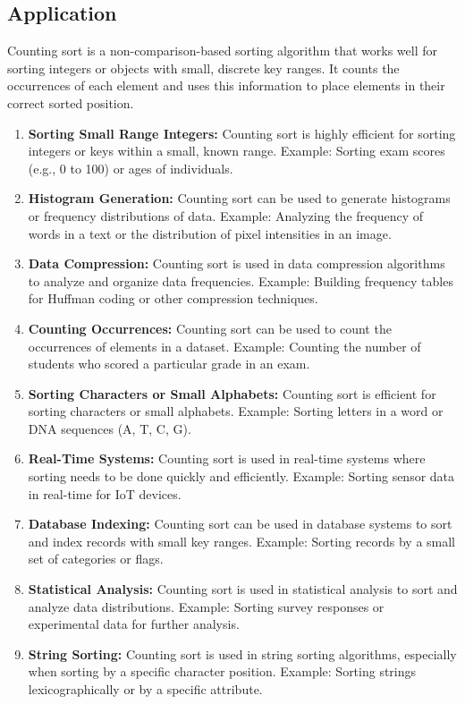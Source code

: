 \subsection{Application}
Counting sort is a non-comparison-based sorting algorithm that works well for sorting integers or objects with small, discrete key ranges. It counts the occurrences of each element and uses this information to place elements in their correct sorted position.
\begin{enumerate}
    \item \textbf{Sorting Small Range Integers:} Counting sort is highly efficient for sorting integers or keys within a small, known range. Example: Sorting exam scores (e.g., 0 to 100) or ages of individuals.
    \item \textbf{Histogram Generation:} Counting sort can be used to generate histograms or frequency distributions of data. Example: Analyzing the frequency of words in a text or the distribution of pixel intensities in an image.
    \item \textbf{Data Compression:} Counting sort is used in data compression algorithms to analyze and organize data frequencies. Example: Building frequency tables for Huffman coding or other compression techniques.
    \item \textbf{Counting Occurrences:} Counting sort can be used to count the occurrences of elements in a dataset. Example: Counting the number of students who scored a particular grade in an exam.
    \item \textbf{Sorting Characters or Small Alphabets:} Counting sort is efficient for sorting characters or small alphabets. Example: Sorting letters in a word or DNA sequences (A, T, C, G).
    \item \textbf{Real-Time Systems:} Counting sort is used in real-time systems where sorting needs to be done quickly and efficiently. Example: Sorting sensor data in real-time for IoT devices.
    \item \textbf{Database Indexing:} Counting sort can be used in database systems to sort and index records with small key ranges. Example: Sorting records by a small set of categories or flags.
    \item \textbf{Statistical Analysis:} Counting sort is used in statistical analysis to sort and analyze data distributions. Example: Sorting survey responses or experimental data for further analysis.
    \item \textbf{String Sorting:} Counting sort is used in string sorting algorithms, especially when sorting by a specific character position. Example: Sorting strings lexicographically or by a specific attribute.
\end{enumerate}

